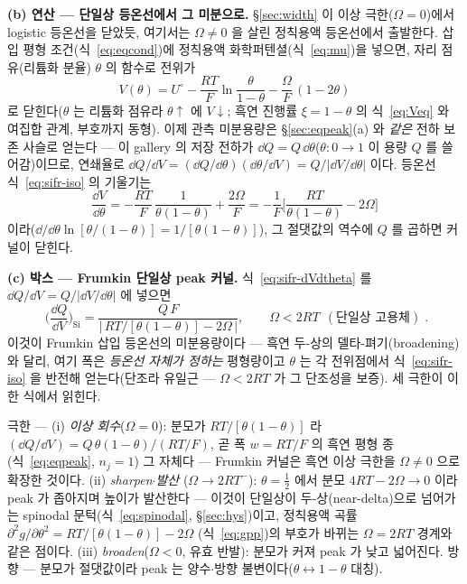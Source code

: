 \textbf{(b) 연산 --- 단일상 등온선에서 그 미분으로.} \S\ref{sec:width} 이 이상 극한($\Omega{=}0$)에서 logistic
등온선을 닫았듯, 여기서는 $\Omega\neq0$ 을 살린 정칙용액 등온선에서 출발한다. 삽입 평형 조건(식~\eqref{eq:eqcond})에
정칙용액 화학퍼텐셜(식~\eqref{eq:mu})을 넣으면, 자리 점유(리튬화 분율) $\theta$ 의 함수로 전위가
\begin{equation}
V(\theta)=U^{\circ}-\frac{RT}{F}\ln\frac{\theta}{1-\theta}-\frac{\Omega}{F}\,(1-2\theta)
\label{eq:sifr-iso}
\end{equation}
로 닫힌다($\theta$ 는 리튬화 점유라 $\theta\!\uparrow$ 에 $V\!\downarrow$; 흑연 진행률 $\xi{=}1-\theta$ 의
식~\eqref{eq:Veq} 와 여집합 관계, 부호까지 동형). 이제 관측 미분용량은 \S\ref{sec:eqpeak}(a) 와 \emph{같은}
전하 보존 사슬로 얻는다 --- 이 gallery 의 저장 전하가 $\dd Q=Q\,\dd\theta$($\theta:0\!\to\!1$ 이 용량 $Q$ 를
쓸어감)이므로, 연쇄율로 $\dd Q/\dd V=(\dd Q/\dd\theta)(\dd\theta/\dd V)=Q/|\dd V/\dd\theta|$ 이다. 등온선
식~\eqref{eq:sifr-iso} 의 기울기는
\begin{equation}
\frac{\dd V}{\dd\theta}=-\frac{RT}{F}\,\frac{1}{\theta(1-\theta)}+\frac{2\Omega}{F}
=-\frac1F\Big[\frac{RT}{\theta(1-\theta)}-2\Omega\Big]
\label{eq:sifr-dVdtheta}
\end{equation}
이라($\dd/\dd\theta\ln[\theta/(1-\theta)]=1/[\theta(1-\theta)]$), 그 절댓값의 역수에 $Q$ 를 곱하면 커널이 닫힌다.

\textbf{(c) 박스 --- Frumkin 단일상 peak 커널.} 식~\eqref{eq:sifr-dVdtheta} 를 $\dd Q/\dd V=Q/|\dd V/\dd\theta|$
에 넣으면
\begin{equation}
\boxed{\;
\Big(\frac{\dd Q}{\dd V}\Big)_{\!\mathrm{Si}}
=\frac{Q\,F}{\big|\,RT/[\theta(1-\theta)]-2\Omega\,\big|},
\qquad \Omega<2RT\ \ (\text{단일상 고용체})\;.}
\label{eq:sifr-kernel}
\end{equation}
이것이 Frumkin 삽입 등온선의 미분용량이다\cite{leviaurbach1999} --- 흑연 두-상의 델타-펴기(broadening)와
달리, 여기 폭은 \emph{등온선 자체가 정하는} 평형량이고 $\theta$ 는 각 전위점에서 식~\eqref{eq:sifr-iso} 을
반전해 얻는다(단조라 유일근 --- $\Omega<2RT$ 가 그 단조성을 보증). 세 극한이 이 한 식에서 읽힌다.
\begin{signbox}
극한 --- (i) \emph{이상 회수}($\Omega{=}0$): 분모가 $RT/[\theta(1-\theta)]$ 라
$(\dd Q/\dd V)=Q\,\theta(1-\theta)/(RT/F)$, 곧 폭 $w{=}RT/F$ 의 흑연 평형 종(식~\eqref{eq:eqpeak}, $n_j{=}1$)
그 자체다 --- Frumkin 커널은 흑연 이상 극한을 $\Omega{\neq}0$ 으로 확장한 것이다. (ii) \emph{sharpen$\cdot$발산}
($\Omega\!\to\!2RT^{-}$): $\theta{=}\tfrac12$ 에서 분모 $4RT-2\Omega\!\to\!0$ 이라 peak 가 좁아지며 높이가
발산한다 --- 이것이 단일상이 두-상(near-delta)으로 넘어가는 spinodal 문턱(식~\eqref{eq:spinodal},
\S\ref{sec:hys})이고, 정칙용액 곡률 $\partial^2 g/\partial\theta^2=RT/[\theta(1-\theta)]-2\Omega$
(식~\eqref{eq:gpp})의 부호가 바뀌는 $\Omega{=}2RT$ 경계와 같은 점이다. (iii)
\emph{broaden}($\Omega<0$, 유효 반발): 분모가 커져 peak 가 낮고 넓어진다. 방향 --- 분모가 절댓값이라 peak 는
양수$\cdot$방향 불변이다($\theta\!\leftrightarrow\!1-\theta$ 대칭).
\end{signbox}

